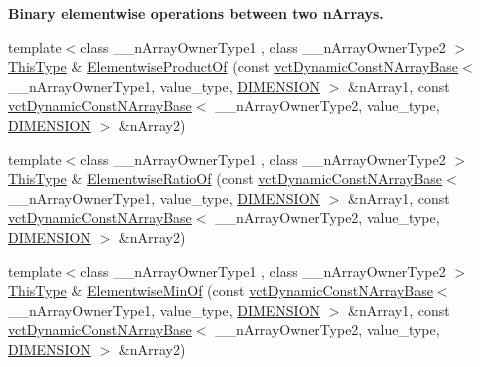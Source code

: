 \begin{Indent}{\bf Binary elementwise operations between two n\-Arrays.}
\begin{DoxyCompactItemize}
\item 
{\footnotesize template$<$class \-\_\-\-\_\-n\-Array\-Owner\-Type1 , class \-\_\-\-\_\-n\-Array\-Owner\-Type2 $>$ }\\\hyperlink{classvct_dynamic_const_n_array_base_a5123caffcf1455a1b99003877eade897}{This\-Type} \& \hyperlink{classvct_dynamic_n_array_base_a703a8bd5b1b643365ee9917a66a0ab30}{Elementwise\-Product\-Of} (const \hyperlink{classvct_dynamic_const_n_array_base}{vct\-Dynamic\-Const\-N\-Array\-Base}$<$ \-\_\-\-\_\-n\-Array\-Owner\-Type1, value\-\_\-type, \hyperlink{classvct_dynamic_n_array_base_aa66532d28588bdf26d08fb593db815d6abfcde386ec801b212d7c42d63a4f3837}{D\-I\-M\-E\-N\-S\-I\-O\-N} $>$ \&n\-Array1, const \hyperlink{classvct_dynamic_const_n_array_base}{vct\-Dynamic\-Const\-N\-Array\-Base}$<$ \-\_\-\-\_\-n\-Array\-Owner\-Type2, value\-\_\-type, \hyperlink{classvct_dynamic_n_array_base_aa66532d28588bdf26d08fb593db815d6abfcde386ec801b212d7c42d63a4f3837}{D\-I\-M\-E\-N\-S\-I\-O\-N} $>$ \&n\-Array2)
\item 
{\footnotesize template$<$class \-\_\-\-\_\-n\-Array\-Owner\-Type1 , class \-\_\-\-\_\-n\-Array\-Owner\-Type2 $>$ }\\\hyperlink{classvct_dynamic_const_n_array_base_a5123caffcf1455a1b99003877eade897}{This\-Type} \& \hyperlink{classvct_dynamic_n_array_base_aeab4d58e6af9be92ae2bc183eb971d92}{Elementwise\-Ratio\-Of} (const \hyperlink{classvct_dynamic_const_n_array_base}{vct\-Dynamic\-Const\-N\-Array\-Base}$<$ \-\_\-\-\_\-n\-Array\-Owner\-Type1, value\-\_\-type, \hyperlink{classvct_dynamic_n_array_base_aa66532d28588bdf26d08fb593db815d6abfcde386ec801b212d7c42d63a4f3837}{D\-I\-M\-E\-N\-S\-I\-O\-N} $>$ \&n\-Array1, const \hyperlink{classvct_dynamic_const_n_array_base}{vct\-Dynamic\-Const\-N\-Array\-Base}$<$ \-\_\-\-\_\-n\-Array\-Owner\-Type2, value\-\_\-type, \hyperlink{classvct_dynamic_n_array_base_aa66532d28588bdf26d08fb593db815d6abfcde386ec801b212d7c42d63a4f3837}{D\-I\-M\-E\-N\-S\-I\-O\-N} $>$ \&n\-Array2)
\item 
{\footnotesize template$<$class \-\_\-\-\_\-n\-Array\-Owner\-Type1 , class \-\_\-\-\_\-n\-Array\-Owner\-Type2 $>$ }\\\hyperlink{classvct_dynamic_const_n_array_base_a5123caffcf1455a1b99003877eade897}{This\-Type} \& \hyperlink{classvct_dynamic_n_array_base_aa29a945c1f4ce1bb02ca5f5c0c79a343}{Elementwise\-Min\-Of} (const \hyperlink{classvct_dynamic_const_n_array_base}{vct\-Dynamic\-Const\-N\-Array\-Base}$<$ \-\_\-\-\_\-n\-Array\-Owner\-Type1, value\-\_\-type, \hyperlink{classvct_dynamic_n_array_base_aa66532d28588bdf26d08fb593db815d6abfcde386ec801b212d7c42d63a4f3837}{D\-I\-M\-E\-N\-S\-I\-O\-N} $>$ \&n\-Array1, const \hyperlink{classvct_dynamic_const_n_array_base}{vct\-Dynamic\-Const\-N\-Array\-Base}$<$ \-\_\-\-\_\-n\-Array\-Owner\-Type2, value\-\_\-type, \hyperlink{classvct_dynamic_n_array_base_aa66532d28588bdf26d08fb593db815d6abfcde386ec801b212d7c42d63a4f3837}{D\-I\-M\-E\-N\-S\-I\-O\-N} $>$ \&n\-Array2)

\end{DoxyCompactItemize}
\end{Indent}
